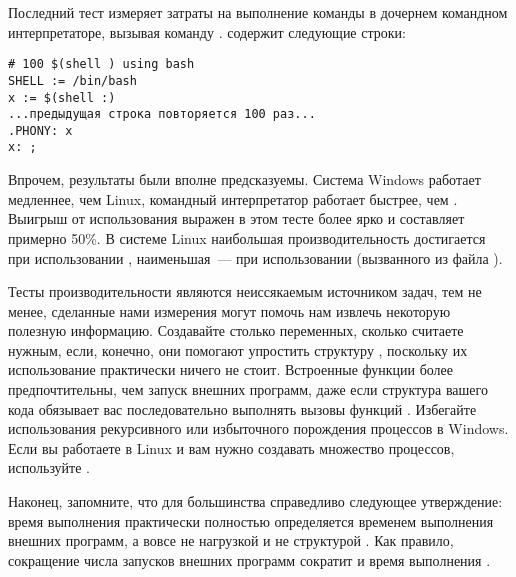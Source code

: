 Последний тест измеряет затраты на выполнение команды в дочернем
командном интерпретаторе, вызывая команду .
\makefile{} содержит следующие строки:

{\footnotesize
\begin{verbatim}
# 100 $(shell ) using bash
SHELL := /bin/bash
x := $(shell :)
...предыдущая строка повторяется 100 раз...
.PHONY: x
x: ;
\end{verbatim}
}

Впрочем, результаты были вполне предсказуемы. Система Windows работает
медленнее, чем Linux, командный интерпретатор 
работает быстрее, чем . Выигрыш от использования
 выражен в этом тесте более ярко и составляет примерно
50\%. В системе Linux наибольшая производительность достигается при
использовании , наименьшая~--- при использовании
 (вызванного из файла ).

Тесты производительности являются неиссякаемым источником задач,
тем не менее, сделанные нами измерения могут помочь нам извлечь
некоторую полезную информацию. Создавайте столько переменных, сколько
считаете нужным, если, конечно, они помогают упростить структуру
, поскольку их использование практически ничего не стоит.
Встроенные функции более предпочтительны, чем запуск внешних программ,
даже если структура вашего кода обязывает вас последовательно
выполнять вызовы функций \GNUmake{}. Избегайте использования
рекурсивного \GNUmake{} или избыточного порождения процессов в
Windows. Если вы работаете в Linux и вам нужно создавать множество
процессов, используйте .

Наконец, запомните, что для большинства  справедливо
следующее утверждение: время выполнения  практически
полностью определяется временем выполнения внешних программ, а вовсе
не нагрузкой \GNUmake{} и не структурой . Как правило,
сокращение числа запусков внешних программ сократит и время выполнения
.
